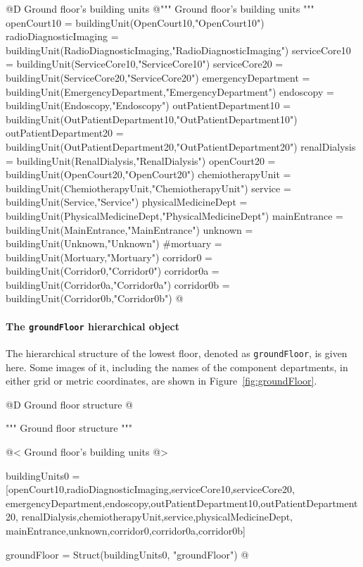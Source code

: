 \documentclass[11pt,oneside]{article}    %
\begin{document}
@D Ground floor's building units 
@{""" Ground floor's building units """
openCourt10 = buildingUnit(OpenCourt10,"OpenCourt10")
radioDiagnosticImaging = buildingUnit(RadioDiagnosticImaging,"RadioDiagnosticImaging")
serviceCore10 = buildingUnit(ServiceCore10,"ServiceCore10")
serviceCore20 = buildingUnit(ServiceCore20,"ServiceCore20")
emergencyDepartment = buildingUnit(EmergencyDepartment,"EmergencyDepartment")
endoscopy = buildingUnit(Endoscopy,"Endoscopy")
outPatientDepartment10 = buildingUnit(OutPatientDepartment10,"OutPatientDepartment10")
outPatientDepartment20 = buildingUnit(OutPatientDepartment20,"OutPatientDepartment20")
renalDialysis = buildingUnit(RenalDialysis,"RenalDialysis")
openCourt20 = buildingUnit(OpenCourt20,"OpenCourt20")
chemiotherapyUnit = buildingUnit(ChemiotherapyUnit,"ChemiotherapyUnit")
service = buildingUnit(Service,"Service")
physicalMedicineDept = buildingUnit(PhysicalMedicineDept,"PhysicalMedicineDept")
mainEntrance = buildingUnit(MainEntrance,"MainEntrance")
unknown = buildingUnit(Unknown,"Unknown")
#mortuary = buildingUnit(Mortuary,"Mortuary")
corridor0 = buildingUnit(Corridor0,"Corridor0")
corridor0a = buildingUnit(Corridor0a,"Corridor0a")
corridor0b = buildingUnit(Corridor0b,"Corridor0b")
@}

\paragraph{The \texttt{groundFloor} hierarchical object}
The hierarchical structure of the lowest floor, denoted as \texttt{groundFloor}, is given here.
Some images of it, including the names of the component departments, in either grid or metric coordinates, are shown in Figure~\ref{fig:groundFloor}.

@D Ground floor structure
@{""" Ground floor structure """

@< Ground floor's building units @>

buildingUnits0 = [openCourt10,radioDiagnosticImaging,serviceCore10,serviceCore20,
    emergencyDepartment,endoscopy,outPatientDepartment10,outPatientDepartment20,
    renalDialysis,chemiotherapyUnit,service,physicalMedicineDept,
    mainEntrance,unknown,corridor0,corridor0a,corridor0b]
    
groundFloor = Struct(buildingUnits0, "groundFloor")
@}
\end{document}
